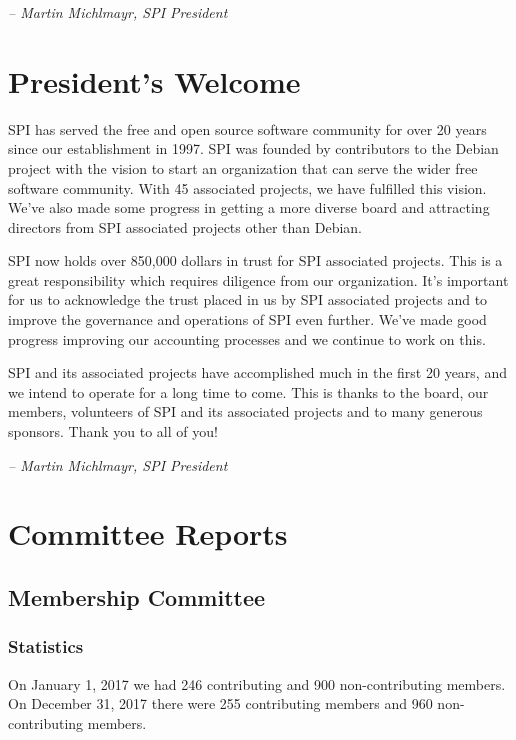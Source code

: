\documentclass[a4paper]{report}
\begin{document}
  \emph{-- Martin Michlmayr, SPI President}

\newpage

\tableofcontents

\newpage

\chapter{President's Welcome}
\label{sec:president}

SPI has served the free and open source software community for over 20
years since our establishment in 1997.  SPI was founded by contributors
to the Debian project with the vision to start an organization that can
serve the wider free software community.  With 45 associated projects,
we have fulfilled this vision.  We've also made some progress in getting
a more diverse board and attracting directors from SPI associated
projects other than Debian.

SPI now holds over 850,000 dollars in trust for SPI associated projects.
This is a great responsibility which requires diligence from our
organization.  It's important for us to acknowledge the trust placed in
us by SPI associated projects and to improve the governance and
operations of SPI even further.  We've made good progress improving our
accounting processes and we continue to work on this.

SPI and its associated projects have accomplished much in the first 20
years, and we intend to operate for a long time to come.  This is thanks
to the board, our members, volunteers of SPI and its associated projects
and to many generous sponsors.  Thank you to all of you!

  \emph{-- Martin Michlmayr, SPI President}

\chapter{Committee Reports}
\section{Membership Committee}

\subsection{Statistics}

On January 1, 2017 we had 246 contributing and 900 non-contributing
members.  On December 31, 2017 there were 255 contributing members and
960 non-contributing members.
\end{document}
